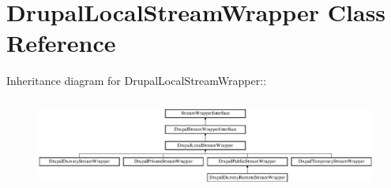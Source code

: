 \hypertarget{classDrupalLocalStreamWrapper}{
\section{DrupalLocalStreamWrapper Class Reference}
\label{classDrupalLocalStreamWrapper}
}
Inheritance diagram for DrupalLocalStreamWrapper::\begin{figure}[H]
\begin{center}
\leavevmode
\includegraphics[height=3.07018cm]{classDrupalLocalStreamWrapper}
\end{center}
\end{figure}
